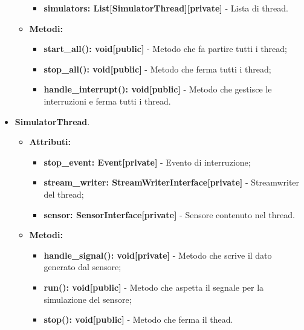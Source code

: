 \documentclass[8pt]{article}
\begin{document}
\begin{itemize}
\begin{itemize}
        \begin{itemize}
	\setlength\itemsep{0em}
            \item \textbf{simulators: List[SimulatorThread][private]} - Lista di thread.
        \end{itemize}
        \item \textbf{Metodi:}
        \begin{itemize}
	\setlength\itemsep{0em}
            \item \textbf{start\_all(): void[public]} - Metodo che fa partire tutti i thread;
            \item \textbf{stop\_all(): void[public]} - Metodo che ferma tutti i thread;
            \item \textbf{handle\_interrupt(): void[public]} - Metodo che gestisce le interruzioni e ferma tutti i thread.
        \end{itemize}
    \end{itemize}
    \item \textbf{SimulatorThread}.
    \begin{itemize}
	\setlength\itemsep{0em}
        \item \textbf{Attributi:}
        \begin{itemize}
	\setlength\itemsep{0em}
            \item \textbf{stop\_event: Event[private]} - Evento di interruzione;
            \item \textbf{stream\_writer: StreamWriterInterface[private]} - Streamwriter del thread;
            \item \textbf{sensor: SensorInterface[private]} - Sensore contenuto nel thread.
        \end{itemize}
        \item \textbf{Metodi:}
        \begin{itemize}
	\setlength\itemsep{0em}
            \item \textbf{handle\_signal(): void[private]} - Metodo che scrive il dato generato dal sensore;
            \item \textbf{run(): void[public]} - Metodo che aspetta il segnale per la simulazione del sensore;
            \item \textbf{stop(): void[public]} - Metodo che ferma il thead.
        \end{itemize}
    \end{itemize}
\end{itemize}
\end{document}
